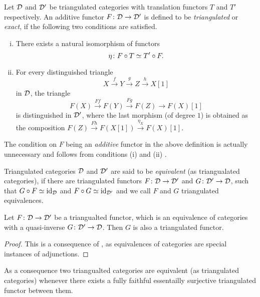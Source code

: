 \begin{definition}
    Let $\mathcal D$ and $\mathcal D'$ be triangulated categories with translation functors $T$ and $T'$ respectively. An additive functor $F \colon \mathcal D \to \mathcal D'$ is defined to be \emph{triangulated} or \emph{exact}, if the following two conditions are satisfied.
    \begin{enumerate}[(i)]
        \item There exists a natural isomorphism of functors 
        \[
            \eta \colon F \circ T \simeq T' \circ F.
        \]
        \item For every distinguished triangle
        \[
            X\xrightarrow{f} Y \xrightarrow{g} Z \xrightarrow{h} X[1]
        \]
        in $\mathcal D$, the triangle
        \[
            F(X) \xrightarrow{Ff} F(Y) \xrightarrow{Fg} F(Z) \to F(X)[1] 
        \]
        is distinguished in $\mathcal D'$, where the last morphism (of degree $1$) is obtained as the composition $F(Z) \xrightarrow{Fh} F(X[1]) \xrightarrow{\eta_X} F(X)[1]$.
    \end{enumerate}
\end{definition}

\begin{remark}
    The condition on $F$ being an \emph{additive} functor in the above definition is actually unnecessary and follows from conditions (i) and (ii) \cite[\href{https://stacks.math.columbia.edu/tag/05QY}{Tag 05QY}]{stacks-project}.
\end{remark}

Triangulated categories $\mathcal D$ and $\mathcal D'$ are said to be \emph{equivalent} (as triangualated categories), if there are triangulated functors $F \colon \mathcal D \to \mathcal D'$ and $G \colon \mathcal D' \to \mathcal D$, such that $G \circ F \simeq \operatorname{id}_{\mathcal D}$ and $F \circ G \simeq \operatorname{id}_{\mathcal D'}$ and we call $F$ and $G$ triangulated equivalences.

\begin{proposition}
    Let $F \colon \mathcal D \to \mathcal D'$ be a triangualted functor, which is an equivalence of categories with a quasi-inverse $G \colon \mathcal D' \to \mathcal D$. Then $G$ is also a triangulated  functor. 
\end{proposition}

\begin{proof}
    This is a consequence of \cite[Proposition 1.41]{huybrechts2006fouriermukai}, as equivalences of categories are special instances of adjunctions. 
\end{proof}

As a consequence two triangualted categories are equivalent (as triangulated categories) whenever there exists a fully faithful essentailly surjective triangulated functor between them. 

